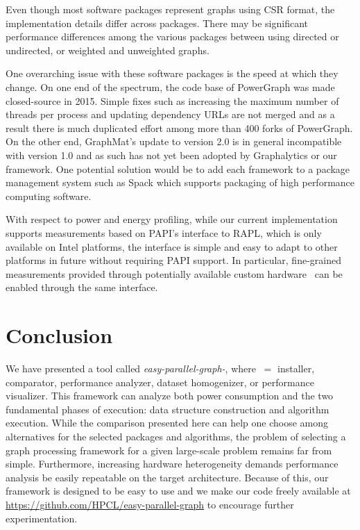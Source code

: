 \documentclass[conference]{IEEEtran}
\begin{document}
Even though most software packages represent graphs using CSR format, the implementation details differ across packages. There may be significant performance differences among the various packages between using directed or undirected, or weighted and unweighted graphs.

One overarching issue with these software packages is the speed at which they change. On one end of the spectrum, the code base of PowerGraph was made closed-source in 2015. Simple fixes such as increasing the maximum number of threads per process and updating dependency URLs are not merged and as a result there is much duplicated effort among more than 400 forks of PowerGraph. On the other end, GraphMat's update to version 2.0 is in general incompatible with version 1.0 and as such has not yet been adopted by Graphalytics or our framework. One potential solution would be to add each framework to a package management system such as Spack \cite{Gamblin:2015:Spack} which supports packaging of high performance computing software.

With respect to power and energy profiling, while our current implementation supports measurements based on PAPI's interface to RAPL, which is only available on Intel platforms, the interface is simple and easy to adapt to other platforms in future without requiring PAPI support. In particular, fine-grained measurements provided through potentially available custom hardware~\cite{naecon15} can be enabled through the same interface.

\section{Conclusion}
We have presented a tool called \emph{easy-parallel-graph\mbox{-\textasteriskcentered}}, where \textasteriskcentered $\ = $ installer, comparator, performance analyzer, dataset homogenizer, or performance visualizer. This framework can analyze both power consumption and the two fundamental phases of execution: data structure construction and algorithm execution. While the comparison presented here can help one choose among alternatives for the selected packages and algorithms, the problem of selecting a graph processing framework for a given large-scale problem remains far from simple. Furthermore, increasing hardware heterogeneity demands performance analysis be easily repeatable on the target architecture. Because of this, our framework is designed to be easy to use and we make our code freely available at \url{https://github.com/HPCL/easy-parallel-graph} to encourage further experimentation.
\end{document}
